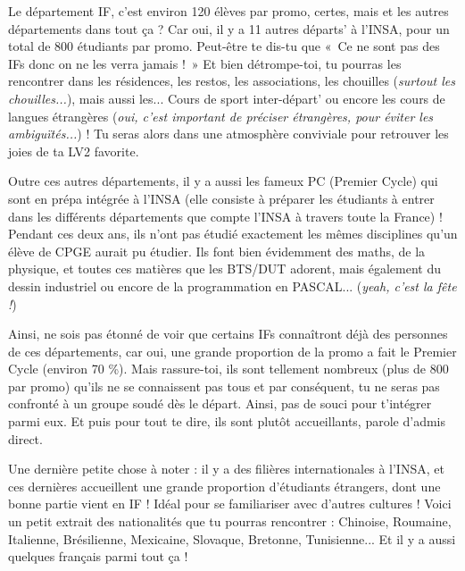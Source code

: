 Le département IF, c'est environ 120 élèves par promo, certes, mais et les autres départements dans tout ça ?
Car oui, il y a 11 autres départs' à l'INSA, pour un total de 800 étudiants par promo.
Peut-être te dis-tu que «~Ce ne sont pas des IFs donc on ne les verra jamais !~»
Et bien détrompe-toi, tu pourras les rencontrer dans les résidences, les restos,
les associations, les chouilles (\emph{surtout les chouilles...}), mais
aussi les... Cours de sport inter-départ' ou encore les cours de langues
étrangères (\emph{oui, c'est important de préciser étrangères, pour éviter les
ambiguïtés...}) ! Tu seras alors dans une atmosphère conviviale pour
retrouver les joies de ta LV2 favorite.

\vspace{1em}

Outre ces autres départements, il y a aussi les fameux PC (Premier
Cycle) qui sont en prépa intégrée à l'INSA (elle consiste à préparer les
étudiants à entrer dans les différents départements que compte l'INSA à travers
toute la France) ! Pendant ces deux ans, ils n'ont pas étudié exactement les
mêmes disciplines qu'un élève de CPGE aurait pu étudier. Ils font bien
évidemment des maths, de la physique, et toutes ces matières que les BTS/DUT
adorent, mais également du dessin industriel ou encore de la programmation en
PASCAL... (\emph{yeah, c'est la fête !})

\vspace{1em}

Ainsi, ne sois pas étonné de voir que certains IFs connaîtront déjà des
personnes de ces départements, car oui, une grande proportion de la promo a fait le Premier
Cycle (environ 70 \%). Mais rassure-toi, ils sont tellement nombreux  (plus de
800 par promo) qu'ils ne se connaissent pas tous et par conséquent, tu
ne seras pas confronté à un groupe soudé dès le départ. Ainsi, pas de souci
pour t'intégrer parmi eux. Et puis pour tout te dire, ils sont plutôt
accueillants, parole d'admis direct.

\vspace{1em}

Une dernière petite chose à noter : il y a des filières internationales à
l'INSA, et ces dernières accueillent une grande proportion d'étudiants étrangers, dont
une bonne partie vient en IF ! Idéal pour se familiariser avec d'autres
cultures ! Voici un petit extrait des nationalités que tu pourras rencontrer :
Chinoise, Roumaine, Italienne, Brésilienne, Mexicaine, Slovaque, Bretonne,
Tunisienne... Et il y a aussi quelques français parmi tout ça !
